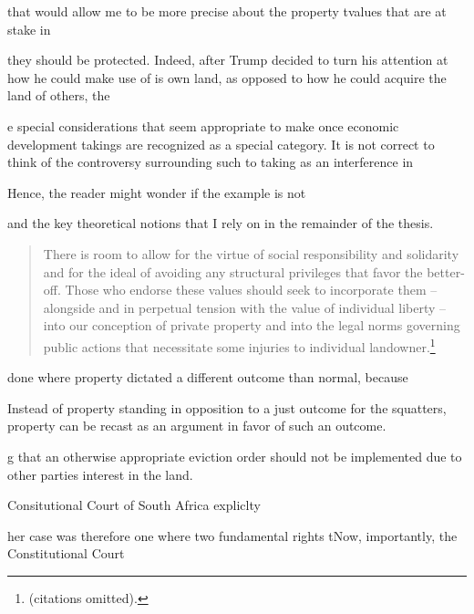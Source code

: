 that would allow me to be more precise about the property tvalues that are at stake in 





they should be protected. Indeed, after Trump decided to turn his attention at how he could make use of is own land, as opposed to how he could acquire the land of others, the 

e special considerations that seem appropriate to make once economic development takings are recognized as a special category. It is not correct to think of the controversy surrounding such to taking as an interference in 



Hence, the reader might wonder if the example is not 


and the key theoretical notions that I rely on in the remainder of the thesis.



\begin{quote}
There is room to allow for the virtue of social responsibility and solidarity and for the ideal of avoiding any structural privileges that favor the better-off. Those who endorse these values should seek to
incorporate them -- alongside and in perpetual tension with the value of
individual liberty -- into our conception of private property and into the legal norms governing
public actions that necessitate some injuries to individual landowner.\footnote{\cite[802]{dagan99} (citations omitted).}
\end{quote}




done where property dictated a different outcome than normal, because 

Instead of property standing in opposition to a just outcome for the squatters, property can be recast as an argument in favor of such an outcome.





g that an otherwise appropriate eviction order should not be implemented due to other parties interest in the land. 


Consitutional Court of South Africa expliclty


her case was therefore one where two fundamental rights tNow, importantly, the Constitutional Court 



